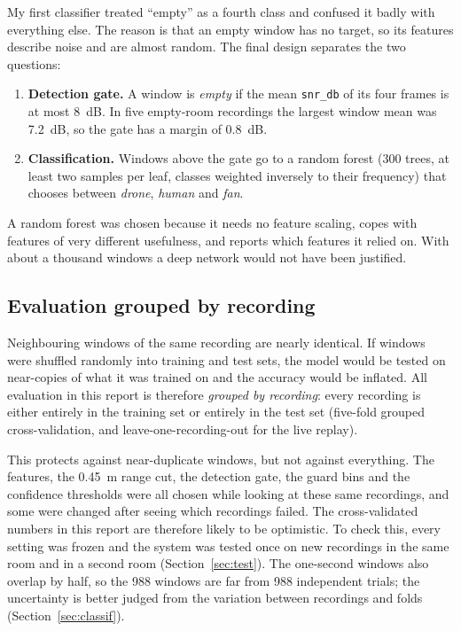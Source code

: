 \documentclass[11pt,a4paper]{article}
\begin{document}
My first classifier treated ``empty'' as a fourth class and confused it badly with everything else. The reason is that an empty window has no target, so its features describe noise and are almost random. The final design separates the two questions:
\begin{enumerate}
\item \textbf{Detection gate.} A window is \emph{empty} if the mean \texttt{snr\_db} of its four frames is at most \SI{8}{dB}. In five empty-room recordings the largest window mean was \SI{7.2}{dB}, so the gate has a margin of \SI{0.8}{dB}.
\item \textbf{Classification.} Windows above the gate go to a random forest (300 trees, at least two samples per leaf, classes weighted inversely to their frequency) that chooses between \emph{drone}, \emph{human} and \emph{fan}.
\end{enumerate}
A random forest was chosen because it needs no feature scaling, copes with features of very different usefulness, and reports which features it relied on. With about a thousand windows a deep network would not have been justified.

\subsection{Evaluation grouped by recording}

Neighbouring windows of the same recording are nearly identical. If windows were shuffled randomly into training and test sets, the model would be tested on near-copies of what it was trained on and the accuracy would be inflated. All evaluation in this report is therefore \emph{grouped by recording}: every recording is either entirely in the training set or entirely in the test set (five-fold grouped cross-validation, and leave-one-recording-out for the live replay).

This protects against near-duplicate windows, but not against everything. The features, the \SI{0.45}{m} range cut, the detection gate, the guard bins and the confidence thresholds were all chosen while looking at these same recordings, and some were changed after seeing which recordings failed. The cross-validated numbers in this report are therefore likely to be optimistic. To check this, every setting was frozen and the system was tested once on new recordings in the same room and in a second room (Section~\ref{sec:test}). The one-second windows also overlap by half, so the 988 windows are far from 988 independent trials; the uncertainty is better judged from the variation between recordings and folds (Section~\ref{sec:classif}).
\end{document}
